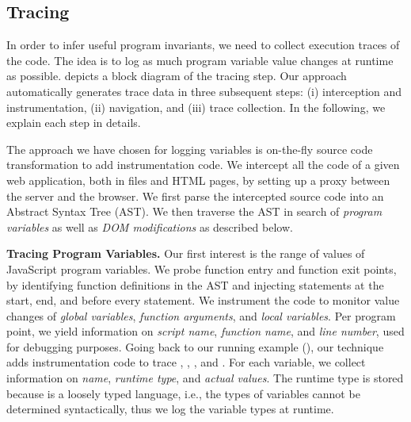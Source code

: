 \subsection{\javascript Tracing}
In order to infer useful program invariants, we need to collect execution traces of the \javascript code. The idea is to log as much program variable value changes at runtime as possible.   depicts a block diagram of the tracing step. Our approach automatically generates trace data in three subsequent steps: 
(i) \javascript interception and instrumentation, (ii) navigation, and (iii) trace collection. In the following, we explain each step in details. 

 The approach we have chosen for logging variables is on-the-fly \javascript source code transformation to add instrumentation code.
We intercept all the \javascript code of a given web application, both in \javascript files and HTML pages, by setting up a proxy \cite{bezemer:esec09} between the server and the browser. We first parse the intercepted source code into an Abstract Syntax Tree (AST). 
We then traverse the AST in search of \emph{program variables} as well as \emph{DOM modifications} as described below.

{\bf Tracing Program Variables.} Our first interest is the range of values of JavaSc\-ript program variables. We probe function entry and function exit points, by identifying function definitions in the AST and injecting statements at the start, end, and before every  statement. We instrument the code to monitor value changes of \emph{global variables}, \emph{function arguments}, and \emph{local variables}. 
Per program point, we yield information on \emph{script name}, \emph{function name}, and \emph{line number}, used for debugging purposes. Going back to our running example (), our technique adds instrumentation code to trace , , , and . For each variable, we collect information on \emph{name}, \emph{runtime type}, and \emph{actual values}. The runtime type is stored because \javascript is a loosely typed language, i.e., the types of variables cannot be determined syntactically, thus we log the variable types at runtime.

